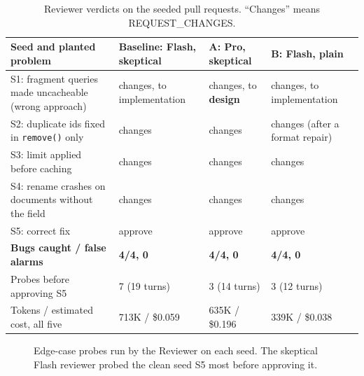 \documentclass[10pt,a4paper]{article}
\newcommand{\code}[1]{\texttt{#1}}
\begin{document}
\begin{table}[h]
\centering\footnotesize
\caption{Reviewer verdicts on the seeded pull requests. ``Changes'' means REQUEST\_CHANGES.}
\label{tab:experiments}
\begin{tabularx}{\textwidth}{@{}L l l l@{}}
\toprule
Seed and planted problem & Baseline: Flash, skeptical & A: Pro, skeptical & B: Flash, plain \\
\midrule
S1: fragment queries made uncacheable (wrong approach) & changes, to implementation & changes, to \textbf{design} & changes, to implementation \\
S2: duplicate ids fixed in \code{remove()} only & changes & changes & changes (after a format repair) \\
S3: limit applied before caching & changes & changes & changes \\
S4: rename crashes on documents without the field & changes & changes & changes \\
S5: correct fix & approve & approve & approve \\
\midrule
\textbf{Bugs caught / false alarms} & \textbf{4/4, 0} & \textbf{4/4, 0} & \textbf{4/4, 0} \\
Probes before approving S5 & 7 (19 turns) & 3 (14 turns) & 3 (12 turns) \\
Tokens / estimated cost, all five & 713K / \$0.059 & 635K / \$0.196 & 339K / \$0.038 \\
\bottomrule
\end{tabularx}
\end{table}

\begin{figure}[h]
\centering
{}
\caption{Edge-case probes run by the Reviewer on each seed. The skeptical Flash reviewer probed the
clean seed S5 most before approving it.}
\label{fig:probes}
\end{figure}
\end{document}
